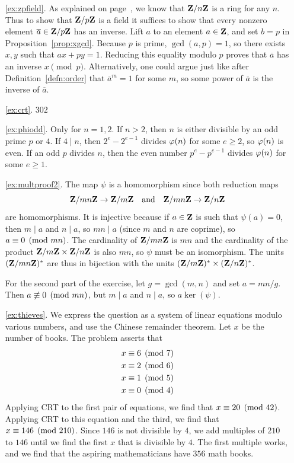 \begin{itemize}
\begin{enumerate}
\item[\ref{ex:zpfield}.] As explained on page~\pageref{page:znring},
we know that $\mathbf{Z}/n\mathbf{Z}{}$ is a ring for any $n$.  Thus to show that
$\mathbf{Z}/p\mathbf{Z}{}$ is a field it suffices to show that every nonzero element
$\overline{a}\in\mathbf{Z}/p\mathbf{Z}{}$ has an inverse.  Lift $a$ to an element $a\in\mathbf{Z}$,
and set $b=p$ in Proposition~\ref{prop:xgcd}.   Because $p$ is prime,
$\gcd(a,p)=1$, so there exists $x,y$ such that $ax + py = 1$.
Reducing this equality modulo $p$ proves that $\overline{a}$ has
an inverse $x\pmod{p}$.  Alternatively, one could argue just
like after Definition~\ref{defn:order} that $\overline{a}^m=1$
for some $m$, so some power of $\overline{a}$ is the
inverse of $\overline{a}$.

\item[\ref{ex:crt}.] $302$

\item[\ref{ex:phiodd}.] Only for $n=1,2$.  If $n>2$, then
$n$ is either divisible by an odd prime $p$ or $4$.  If $4\mid n$,
then $2^e-2^{e-1}$ divides $\varphi(n)$ for some $e\geq 2$, so $\varphi(n)$
is even.  If an odd $p$ divides $n$, then the even number
$p^e-p^{e-1}$ divides $\varphi(n)$ for some $e\geq 1$.

\item[\ref{ex:multproof2}.]  The map $\psi$ is a homomorphism since
both reduction maps $$\mathbf{Z}/mn\mathbf{Z}{}\to \mathbf{Z}/m\mathbf{Z}{}\quad\text{and}\quad
\mathbf{Z}/mn\mathbf{Z}{}\to \mathbf{Z}/n\mathbf{Z}{}$$
are homomorphisms.  It is injective because if $a\in\mathbf{Z}$ is such
that $\psi(a)=0$, then $m\mid a$ and $n\mid a$, so $mn\mid a$ (since
$m$ and $n$ are coprime), so $a\equiv 0\pmod{mn}$.
The cardinality of $\mathbf{Z}/mn\mathbf{Z}{}$ is $mn$ and the cardinality of
the product $\mathbf{Z}/m\mathbf{Z}{}\times \mathbf{Z}/n\mathbf{Z}{}$ is also $mn$, so $\psi$
must be an isomorphism.  The units $(\mathbf{Z}/mn\mathbf{Z}{})^*$ are thus
in bijection with the units $(\mathbf{Z}/m\mathbf{Z}{})^*\times (\mathbf{Z}/n\mathbf{Z}{})^*$.

For the second part of the exercise, let $g=\gcd(m,n)$ and
set $a=mn/g$.  Then $a\not\equiv 0\pmod{mn}$, but $m\mid a$ and
$n\mid a$, so $a\ker(\psi)$.

\item[\ref{ex:thieves}.] We express the question as a
system of linear equations modulo various numbers, and use the Chinese
remainder theorem.    Let $x$ be the number of books.
The problem asserts that
\begin{align*}
x&\equiv 6\pmod{7}\\
x&\equiv 2\pmod{6}\\
x&\equiv 1\pmod{5}\\
x&\equiv 0\pmod{4}
\end{align*}
Applying CRT to the first pair of equations, we find that
$x\equiv 20\pmod{42}$.  Applying CRT to this equation and
the third, we find that $x\equiv 146\pmod{210}$.  Since $146$
is not divisible by $4$, we add multiples of $210$ to $146$
until we find the first $x$ that is divisible by $4$.  The first multiple
works, and we find that the aspiring mathematicians
have $356$ math books.


\end{enumerate}
\end{itemize}
